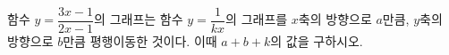 함수 $y=\dfrac{3x-1}{2x-1}$의 그래프는 함수 $y=\dfrac{1}{kx}$의 그래프를 $x$축의 방향으로 $a$만큼, $y$축의 방향으로 $b$만큼 평행이동한 것이다. 이때 $a+b+k$의 값을 구하시오. 
